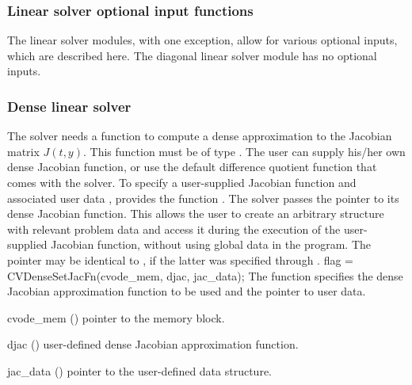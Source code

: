 \subsubsection*{Linear solver optional input functions}\label{sss:optin_linsol}

The linear solver modules, with one exception, allow for various optional 
inputs, which are described here. The diagonal linear solver module has no
optional inputs.

\subsubsection{Dense linear solver}\label{sss:optin_dense}
The 
{\cvdense} solver needs a function to compute a dense approximation to
the Jacobian matrix $J(t,y)$.  This function must be of type . 
The user can supply his/her own dense Jacobian function, or use the default 
difference quotient function  
that comes with the {\cvdense} solver.
To specify a user-supplied Jacobian function  and associated user 
data , {\cvdense} provides the function .
The {\cvdense} solver passes the pointer  
to its dense Jacobian function. This allows the user to
create an arbitrary structure with relevant problem data and access it
during the execution of the user-supplied Jacobian function, without
using global data in the program.  The pointer  may be
identical to , if the latter was specified through .
{
  flag = CVDenseSetJacFn(cvode\_mem, djac, jac\_data);
}
{
  The function  specifies the dense Jacobian
  approximation function to be used and the pointer to user data.
}
{
  \begin{args}
  \item[cvode\_mem] ()
    pointer to the {\cvode} memory block.
  \item[djac] ()
    user-defined dense Jacobian approximation function.
  \item[jac\_data] ()
    pointer to the user-defined data structure.
  \end{args}
}
